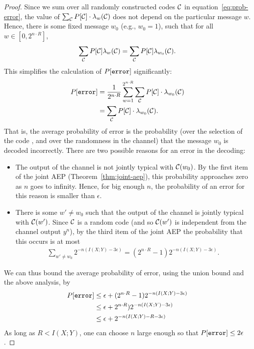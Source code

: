 \begin{proof}
Since we sum over all randomly constructed codes $\mathcal{C}$ in equation~\ref{eq:prob-error}, the value of $\sum_{\mathcal{C}} P[\mathcal{C}] \cdot \lambda_w(\mathcal{C})$ does not depend on the particular message $w$. Hence, there is some fixed message $w_0$ (e.g., $w_0 = 1$), such that for all $w \in [0,2^{n \cdot R}]$,
\begin{align}
\sum_{\mathcal{C}} P[\mathcal{C}] \lambda_w(\mathcal{C}) = \sum_{\mathcal{C}} P[\mathcal{C}] \lambda_{w_0}(\mathcal{C}).
\end{align}
This simplifies the calculation of $P[\texttt{error}]$ significantly:
\begin{align}
P[\texttt{error}] &= \frac{1}{2^{n \cdot R}} \sum_{w = 1}^{2^{n \cdot R}} \sum_{\mathcal{C}} P[\mathcal{C}] \cdot \lambda_{w_0}(\mathcal{C})\nonumber\\
&= \sum_{\mathcal{C}} P[\mathcal{C}] \cdot \lambda_{w_0}(\mathcal{C}).
\end{align}
That is, the average probability of error is the probability (over the selection of the code \cran, and over the randomness in the channel) that the message $w_0$ is decoded incorrectly. There are two possible reasons for an error in the decoding:
\begin{itemize}
\item The output of the channel is not jointly typical with $\mathcal{C}(w_0)$. By the first item of the joint AEP (Theorem~\ref{thm:joint-aep}), this probability approaches zero as $n$ goes to infinity. Hence, for big enough $n$, the probability of an error for this reason is smaller than $\epsilon$.
\item There is some $w' \neq w_0$ such that the output of the channel is jointly typical with $\mathcal{C}(w')$. Since $\mathcal{C}$ is a random code (and so $\mathcal{C}(w')$ is independent from the channel output $y^n$), by the third item of the joint AEP the probability that this occurs is at most
\begin{align}
\sum_{w' \neq w_0} 2^{-n (I(X;Y) - 3 \epsilon)} = (2^{n \cdot R} - 1) 2^{-n (I(X;Y) - 3 \epsilon)}.
\end{align}
\end{itemize}
We can thus bound the average probability of error, using the union bound and the above analysis, by
\begin{align}
P[\texttt{error}] &\leq \epsilon + (2^{n \cdot R} - 1) 2^{-n (I(X;Y) - 3 \epsilon)}\nonumber\\
&\leq \epsilon + 2^{n \cdot R}) 2^{-n (I(X;Y) - 3 \epsilon)}\nonumber\\
&\leq \epsilon + 2^{-n (I(X;Y) - R - 3 \epsilon)}\nonumber\\
\end{align}
As long as $R < I(X;Y)$, one can choose $n$ large enough so that $P[\texttt{error}] \leq 2 \epsilon$.


\end{proof}
